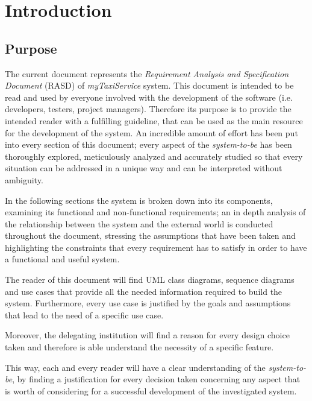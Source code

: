 \section{Introduction}

\subsection{Purpose}

The current document represents the \emph{Requirement Analysis and Specification Document} (RASD) of \emph{myTaxiService} system.
This document is intended to be read and used by everyone involved with the development of the software (i.e. developers, testers, project managers). Therefore its purpose is to provide the intended reader with a fulfilling guideline, that can be used as the main resource for the development of the system.
An incredible amount of effort has been put into every section of this document; every aspect of the \emph{system-to-be} has been thoroughly explored, meticulously analyzed and accurately studied so that every situation can be addressed in a unique way and can be interpreted without ambiguity.

In the following sections the system is broken down into its components, examining its functional and non-functional requirements; an in depth analysis of the relationship between the system and the external world is conducted throughout the document, stressing the assumptions that have been taken and highlighting the constraints that every requirement has to satisfy in order to have a functional and useful system.


The reader of this document will find UML class diagrams, sequence diagrams and use cases that provide all the needed information required to build the system.
Furthermore, every use case is justified by the goals and assumptions that lead to the need of a specific use case.

Moreover, the delegating institution will find a reason for every design choice taken and therefore is able understand the necessity of a specific feature.

This way, each and every reader will have a clear understanding of the \emph{system-to-be}, by finding a justification for every decision taken concerning any aspect that is worth of considering for a successful development of the investigated system.

